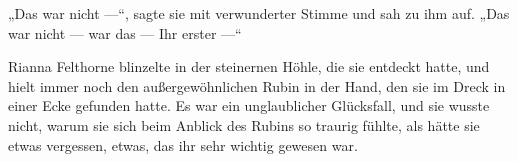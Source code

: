„Das war nicht —“, sagte sie mit verwunderter Stimme und sah zu ihm auf.
„Das war nicht — war das — Ihr erster —“

Rianna Felthorne blinzelte in der steinernen Höhle, die sie entdeckt hatte, und hielt immer noch den außergewöhnlichen Rubin in der Hand, den sie im Dreck in einer Ecke gefunden hatte. Es war ein unglaublicher Glücksfall, und sie wusste nicht, warum sie sich beim Anblick des Rubins so traurig fühlte, als hätte sie etwas vergessen, etwas, das ihr sehr wichtig gewesen war.

